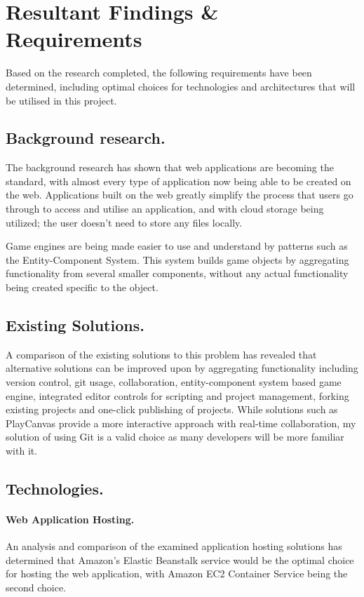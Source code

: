 \section{Resultant Findings \& Requirements}
Based on the research completed, the following requirements have been determined, including optimal choices for technologies and architectures that will be utilised in this project.

\subsection{Background research.}
The background research has shown that web applications are becoming the standard, with almost every type of application now being able to be created on the web. Applications built on the web greatly simplify the process that users go through to access and utilise an application, and with cloud storage being utilized; the user doesn't need to store any files locally.

Game engines are being made easier to use and understand by patterns such as the Entity-Component System. This system builds game objects by aggregating functionality from several smaller components, without any actual functionality being created specific to the object.

\subsection{Existing Solutions.}
A comparison of the existing solutions to this problem has revealed that alternative solutions can be improved upon by aggregating functionality including version control, git usage, collaboration, entity-component system based game engine, integrated editor controls for scripting and project management, forking existing projects and one-click publishing of projects. While solutions such as PlayCanvas provide a more interactive approach with real-time collaboration, my solution of using Git is a valid choice as many developers will be more familiar with it.

\subsection{Technologies.}
\paragraph{Web Application Hosting.}
An analysis and comparison of the examined application hosting solutions has determined that Amazon's Elastic Beanstalk service would be the optimal choice for hosting the web application, with Amazon EC2 Container Service being the second choice.

